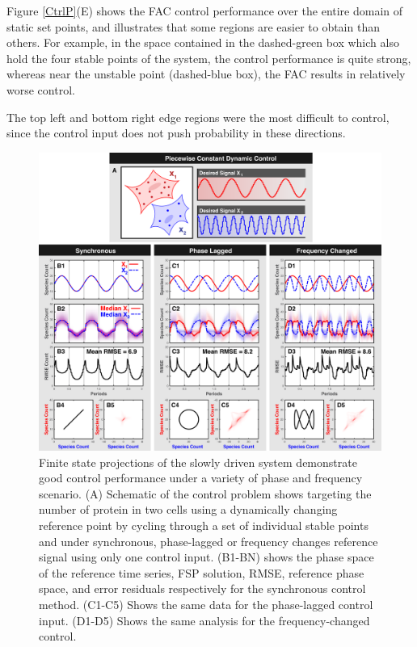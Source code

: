 \documentclass[12pt]{iopart}
\begin{document}
 

Figure \ref{CtrlP}(E) shows the FAC control performance over the entire domain of static set points, and illustrates that some regions are easier to obtain than others. For example, in the space contained in the dashed-green box which also hold the four stable points of the system, the control performance is quite strong, whereas near the unstable point (dashed-blue box), the FAC results in relatively worse control. 

The top left and bottom right edge regions were the most difficult to control, since the control input does not push probability in these directions.  

\begin{figure}
\begin{center}
\includegraphics[width=1\textwidth]{DynamicControl.pdf}
\vspace{-0.1in}
\caption{Finite state projections of the slowly driven system demonstrate good control performance under a variety of phase and frequency scenario. (A) Schematic of the control problem shows targeting the number of protein in two cells using a dynamically changing reference point by cycling through a set of individual stable points and under synchronous, phase-lagged or frequency changes reference signal using only one control input. (B1-BN) shows the phase space of the reference time series, FSP solution, RMSE, reference phase space, and error residuals respectively for the synchronous control method. (C1-C5) Shows the same data for the phase-lagged control input. (D1-D5) Shows the same analysis for the frequency-changed control.}
\label{CR}
\end{center}
\vspace{-0.2in}
\end{figure}
\end{document}
